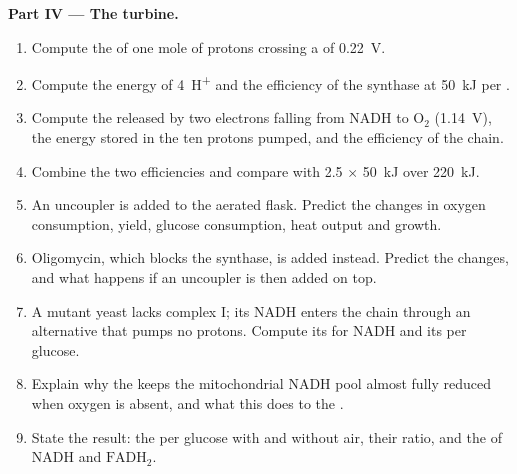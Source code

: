 \begin{problem}
\medskip
\noindent\textbf{Part IV --- The turbine.}
\begin{enumerate}[resume]
  \item Compute the  of one mole of protons crossing a
         of \qty{0.22}{V}.
  \item Compute the energy of \qty{4}{H^+} and the efficiency of the
        synthase at \qty{50}{kJ} per .
  \item Compute the  released by two electrons falling from
        NADH to $\mathrm{O_2}$ (\qty{1.14}{V}), the energy stored in
        the ten protons pumped, and the efficiency of the chain.
  \item Combine the two efficiencies and compare with 2.5  $\times$
        \qty{50}{kJ} over \qty{220}{kJ}.
  \item An uncoupler is added to the aerated flask. Predict the changes
        in oxygen consumption,  yield, glucose consumption, heat
        output and growth.
  \item Oligomycin, which blocks the synthase, is added instead.
        Predict the changes, and what happens if an uncoupler is then
        added on top.
  \item A mutant yeast lacks complex I; its NADH enters the chain
        through an alternative  that pumps no protons. Compute
        its  for NADH and its  per glucose.
  \item Explain why the  keeps the mitochondrial NADH pool almost
        fully reduced when oxygen is absent, and what this does to the
        .
  \item State the result: the  per glucose with and without air,
        their ratio, and the  of NADH and $\mathrm{FADH_2}$.
\end{enumerate}
\end{problem}
